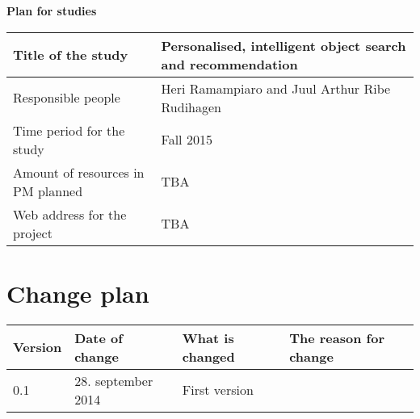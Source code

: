{\bf \Huge Plan for studies} \\[0.5cm]

\begin{center}
  \begin{tabular}{ | l | l |}
    \hline
    Title of the study & Personalised, intelligent object search and recommendation \\ \hline
    Responsible people & Heri Ramampiaro and Juul Arthur Ribe Rudihagen \\ \hline
    Time period for the study & Fall 2015 \\ \hline
    Amount of resources in PM planned & TBA \\ \hline
    Web address for the project & TBA \\
    \hline
  \end{tabular}
\end{center}

\section*{Change plan}

\begin{center}
  \begin{tabular}{ | l | l | l | l |}
    \hline
    Version & Date of change & What is changed & The reason for change \\ \hline
    0.1 & 28. september 2014 & First version & \\
    \hline
  \end{tabular}
\end{center}